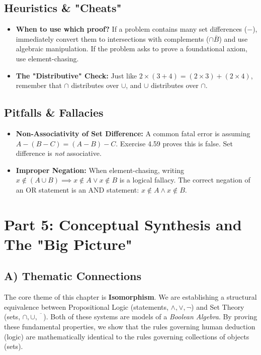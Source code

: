 \documentclass[11pt, a4paper]{article}
\theoremstyle{definition}
\theoremstyle{remark}
\begin{document}
\subsection{Heuristics \& "Cheats"}
\begin{itemize}
    \item \textbf{When to use which proof?} If a problem contains many set differences ($-$), immediately convert them to intersections with complements ($\cap \overline{B}$) and use algebraic manipulation. If the problem asks to prove a foundational axiom, use element-chasing.
    \item \textbf{The "Distributive" Check:} Just like $2 \times (3 + 4) = (2 \times 3) + (2 \times 4)$, remember that $\cap$ distributes over $\cup$, and $\cup$ distributes over $\cap$. 
\end{itemize}

\subsection{Pitfalls \& Fallacies}
\begin{itemize}
    \item \textbf{Non-Associativity of Set Difference:} A common fatal error is assuming $A - (B - C) = (A - B) - C$. Exercise 4.59 proves this is false. Set difference is \textit{not} associative.
    \item \textbf{Improper Negation:} When element-chasing, writing $x \notin (A \cup B) \implies x \notin A \lor x \notin B$ is a logical fallacy. The correct negation of an OR statement is an AND statement: $x \notin A \land x \notin B$.
\end{itemize}

\section{Part 5: Conceptual Synthesis and The "Big Picture"}

\subsection{A) Thematic Connections}
The core theme of this chapter is \textbf{Isomorphism}. We are establishing a structural equivalence between Propositional Logic (statements, $\land, \lor, \neg$) and Set Theory (sets, $\cap, \cup, \overline{\phantom{A}}$). Both of these systems are models of a \textit{Boolean Algebra}. By proving these fundamental properties, we show that the rules governing human deduction (logic) are mathematically identical to the rules governing collections of objects (sets).
\end{document}
